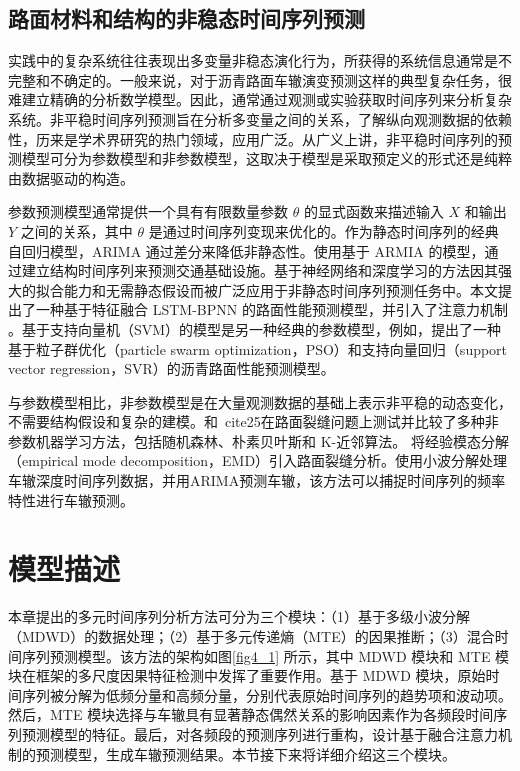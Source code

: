 \subsection{路面材料和结构的非稳态时间序列预测}
实践中的复杂系统往往表现出多变量非稳态演化行为，所获得的系统信息通常是不完整和不确定的。一般来说，对于沥青路面车辙演变预测这样的典型复杂任务，很难建立精确的分析数学模型。因此，通常通过观测或实验获取时间序列来分析复杂系统。非平稳时间序列预测旨在分析多变量之间的关系，了解纵向观测数据的依赖性，历来是学术界研究的热门领域，应用广泛。从广义上讲，非平稳时间序列的预测模型可分为参数模型和非参数模型，这取决于模型是采取预定义的形式还是纯粹由数据驱动的构造\cite{20}。

参数预测模型通常提供一个具有有限数量参数 $\theta$ 的显式函数来描述输入 $X$ 和输出 $Y$ 之间的关系，其中 $\theta$ 是通过时间序列变现来优化的\cite{21}。作为静态时间序列的经典自回归模型，ARIMA 通过差分来降低非静态性。\cite{22}使用基于 ARMIA 的模型，通过建立结构时间序列来预测交通基础设施。基于神经网络和深度学习的方法因其强大的拟合能力和无需静态假设而被广泛应用于非静态时间序列预测任务中。本文提出了一种基于特征融合 LSTM-BPNN 的路面性能预测模型，并引入了注意力机制 \cite{23}。基于支持向量机（SVM）的模型是另一种经典的参数模型，例如，\cite{24}提出了一种基于粒子群优化（particle swarm optimization，PSO）和支持向量回归（support vector regression，SVR）的沥青路面性能预测模型。

与参数模型相比，非参数模型是在大量观测数据的基础上表示非平稳的动态变化，不需要结构假设和复杂的建模。\cite{20}和\ cite{25}在路面裂缝问题上测试并比较了多种非参数机器学习方法，包括随机森林、朴素贝叶斯和 K-近邻算法。\cite{26} 将经验模态分解（empirical mode decomposition，EMD）引入路面裂缝分析。\cite{27}使用小波分解处理车辙深度时间序列数据，并用ARIMA预测车辙，该方法可以捕捉时间序列的频率特性进行车辙预测。

  
\section{模型描述}
本章提出的多元时间序列分析方法可分为三个模块：（1）基于多级小波分解（MDWD）的数据处理；（2）基于多元传递熵（MTE）的因果推断；（3）混合时间序列预测模型。该方法的架构如图\ref{fig4_1} 所示，其中 MDWD 模块和 MTE 模块在框架的多尺度因果特征检测中发挥了重要作用。基于 MDWD 模块，原始时间序列被分解为低频分量和高频分量，分别代表原始时间序列的趋势项和波动项。然后，MTE 模块选择与车辙具有显著静态偶然关系的影响因素作为各频段时间序列预测模型的特征。最后，对各频段的预测序列进行重构，设计基于融合注意力机制的预测模型，生成车辙预测结果。本节接下来将详细介绍这三个模块。


